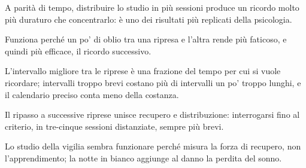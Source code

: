 \begin{sintesi}
  \item A parità di tempo, distribuire lo studio in più sessioni
        produce un ricordo molto più duraturo che concentrarlo: è uno
        dei risultati più replicati della psicologia.
  \item Funziona perché un po' di oblio tra una ripresa e l'altra
        rende più faticoso, e quindi più efficace, il ricordo
        successivo.
  \item L'intervallo migliore tra le riprese è una frazione del tempo
        per cui si vuole ricordare; intervalli troppo brevi costano più
        di intervalli un po' troppo lunghi, e il calendario preciso
        conta meno della costanza.
  \item Il ripasso a successive riprese unisce recupero e
        distribuzione: interrogarsi fino al criterio, in tre-cinque
        sessioni distanziate, sempre più brevi.
  \item Lo studio della vigilia sembra funzionare perché misura la
        forza di recupero, non l'apprendimento; la notte in bianco
        aggiunge al danno la perdita del sonno.
\end{sintesi}

\finecapitolo
